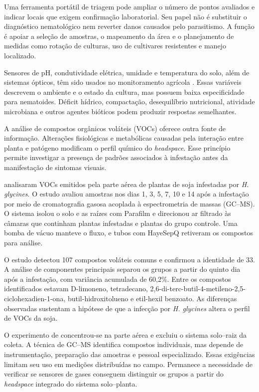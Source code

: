 Uma ferramenta portátil de triagem pode ampliar o número de pontos avaliados e indicar locais que exigem confirmação laboratorial. Seu papel não é substituir o diagnóstico nematológico nem reverter danos causados pelo parasitismo. A função é apoiar a seleção de amostras, o mapeamento da área e o planejamento de medidas como rotação de culturas, uso de cultivares resistentes e manejo localizado.

Sensores de pH, condutividade elétrica, umidade e temperatura do solo, além de sistemas ópticos, têm sido usados no monitoramento agrícola \cite{santos2022}. Essas variáveis descrevem o ambiente e o estado da cultura, mas possuem baixa especificidade para nematoides. Déficit hídrico, compactação, desequilíbrio nutricional, atividade microbiana e outros agentes bióticos podem produzir respostas semelhantes.

A análise de compostos orgânicos voláteis (VOCs) oferece outra fonte de informação. Alterações fisiológicas e metabólicas causadas pela interação entre planta e patógeno modificam o perfil químico do \textit{headspace}. Esse princípio permite investigar a presença de padrões associados à infestação antes da manifestação de sintomas visuais.

 analisaram VOCs emitidos pela parte aérea de plantas de soja infestadas por \textit{H. glycines}. O estudo avaliou amostras nos dias 1, 3, 5, 7, 10 e 14 após a infestação por meio de cromatografia gasosa acoplada à espectrometria de massas (GC--MS). O sistema isolou o solo e as raízes com Parafilm e direcionou ar filtrado às câmaras que continham plantas infestadas e plantas do grupo controle. Uma bomba de vácuo manteve o fluxo, e tubos com HayeSepQ retiveram os compostos para análise.

O estudo detectou 107 compostos voláteis comuns e confirmou a identidade de 33. A análise de componentes principais separou os grupos a partir do quinto dia após a infestação, com variância acumulada de 60,2\%. Entre os compostos identificados estavam D-limoneno, tetradecano, 2,6-di-terc-butil-4-metileno-2,5-ciclohexadien-1-ona, butil-hidroxitolueno e etil-hexil benzoato. As diferenças observadas sustentam a hipótese de que a infecção por \textit{H. glycines} altera o perfil de VOCs da soja.

O experimento de  concentrou-se na parte aérea e excluiu o sistema solo--raiz da coleta. A técnica de GC--MS identifica compostos individuais, mas depende de instrumentação, preparação das amostras e pessoal especializado. Essas exigências limitam seu uso em medições distribuídas no campo. Permanece a necessidade de verificar se sensores de gases conseguem distinguir os grupos a partir do \textit{headspace} integrado do sistema solo--planta.

